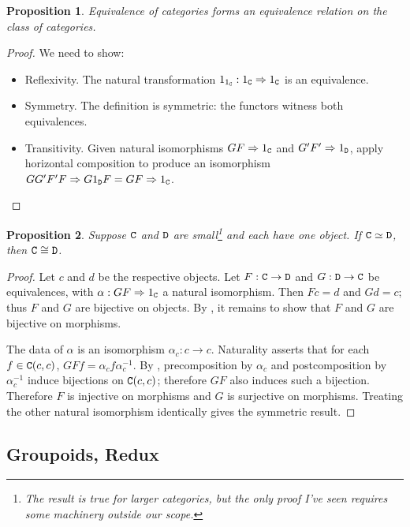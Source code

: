 \documentclass[11 pt]{amsart}
\theoremstyle{plain}   %
\newtheorem{prop}{Proposition}[section]
\theoremstyle{definition}
\theoremstyle{remark}
\numberwithin{equation}{section}
\def\nat{\Rightarrow}
\newcommand{\cat}[1]{{\normalfont\texttt{#1}}}
\begin{document}
\begin{prop}\label{equivalence is equivalence}
	Equivalence of categories forms an equivalence relation on the class of
	categories.
\end{prop}
\begin{proof}
	We need to show:
	\begin{itemize}
		\item Reflexivity. The natural transformation $1_{1_\cat{C}}:
			      1_\cat{C}\nat1_\cat{C}$ is an equivalence.
		\item Symmetry. The definition is symmetric: the functors witness both
		      equivalences.
		\item Transitivity. Given natural isomorphisms $GF\nat 1_\cat{C}$ and
		      $G'F'\nat1_\cat{D}$, apply horizontal composition to produce an
		      isomorphism $GG'F'F\nat G1_\cat{D}F=GF\nat 1_\cat{C}$. \qedhere
	\end{itemize}
\end{proof}

\begin{prop}\label{one object equivalence is isomorphism}
	Suppose $\cat{C}$ and $\cat{D}$ are small\footnote{The result is true for
		larger categories, but the only proof I've seen requires some machinery
		outside our scope.} and each have one object. If $\cat{C}\simeq\cat{D}$, then
	$\cat{C}\cong\cat{D}$.
\end{prop}

\begin{proof}
	Let $c$ and $d$ be the respective objects. Let $F:\cat{C}\rightarrow\cat{D}$
	and $G: \cat{D}\rightarrow\cat{C}$ be equivalences, with $\alpha:
		GF\nat 1_\cat{C}$ a natural isomorphism. Then $Fc = d$ and $Gd = c$;
	thus $F$ and $G$ are bijective on objects. By , it remains to show that $F$ and $G$ are bijective on morphisms.

	The data of $\alpha$ is an isomorphism $\alpha_c: c\rightarrow c$. Naturality
	asserts that for each $f\in\cat{C}(c, c)$, $GFf = \alpha_cf\alpha_c^{-1}$. By
	, precomposition by $\alpha_c$ and
	postcomposition by $\alpha_c^{-1}$ induce bijections on $\cat{C}(c, c)$;
	therefore $GF$ also induces such a bijection. Therefore $F$ is injective on
	morphisms and $G$ is surjective on morphisms. Treating the other natural
	isomorphism identically gives the symmetric result.
\end{proof}

\subsection{Groupoids, Redux}
\end{document}
